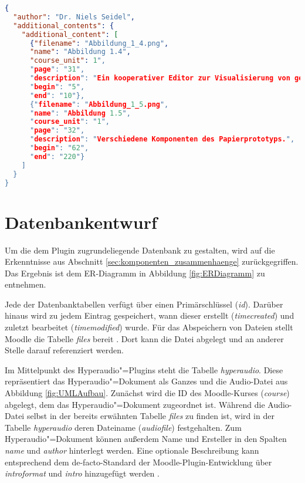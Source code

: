 \begin{lstlisting}[language=json,
             linewidth=\textwidth,
             caption={Beispielhafte Konfigurationsdatei},
             label={lst:JSON}]             
{
  "author": "Dr. Niels Seidel",
  "additional_contents": {
    "additional_content": [
      {"filename": "Abbildung_1_4.png",
      "name": "Abbildung 1.4",
      "course_unit": 1", 
      "page": "31",
      "description": "Ein kooperativer Editor zur Visualisierung von gemeinsam zu lernenden Vokabeln.",
      "begin": "5",
      "end": "10"},
      {"filename": "Abbildung_1_5.png",
      "name": "Abbildung 1.5",
      "course_unit": "1",
      "page": "32",
      "description": "Verschiedene Komponenten des Papierprototyps.",
      "begin": "62",
      "end": "220"}
    ]
  }
}
\end{lstlisting}

\section{Datenbankentwurf}
\label{sec:datenbank}
Um die dem Plugin zugrundeliegende Datenbank zu gestalten, wird auf die Erkenntnisse aus Abschnitt \ref{sec:komponenten_zusammenhaenge} zurückgegriffen. Das Ergebnis ist dem ER-Diagramm in Abbildung \ref{fig:ERDiagramm} zu entnehmen.

Jede der Datenbanktabellen verfügt über einen Primärschlüssel (\textit{id}). Darüber hinaus wird zu jedem Eintrag gespeichert, wann dieser erstellt (\textit{timecreated}) und zuletzt bearbeitet (\textit{timemodified}) wurde. Für das Abspeichern von Dateien stellt Moodle die Tabelle \textit{files} bereit \citep{moodle2018file}. Dort kann die Datei abgelegt und an anderer Stelle darauf referenziert werden.

Im Mittelpunkt des Hyperaudio"=Plugins steht die Tabelle \textit{hyperaudio}. Diese repräsentiert das Hyperaudio"=Dokument als Ganzes und die Audio-Datei aus Abbildung \ref{fig:UMLAufbau}. Zunächst wird die ID des Moodle-Kurses (\textit{course}) abgelegt, dem das Hyperaudio"=Dokument zugeordnet ist. Während die Audio-Datei selbst in der bereits erwähnten Tabelle \textit{files} zu finden ist, wird in der Tabelle \textit{hyperaudio} deren Dateiname (\textit{audiofile}) festgehalten. Zum Hyperaudio"=Dokument können außerdem Name und Ersteller in den Spalten \textit{name} und \textit{author} hinterlegt werden. Eine optionale Beschreibung kann entsprechend dem de-facto-Standard der Moodle-Plugin-Entwicklung über \textit{introformat} und \textit{intro} hinzugefügt werden \citep{moodle2016activity}.


